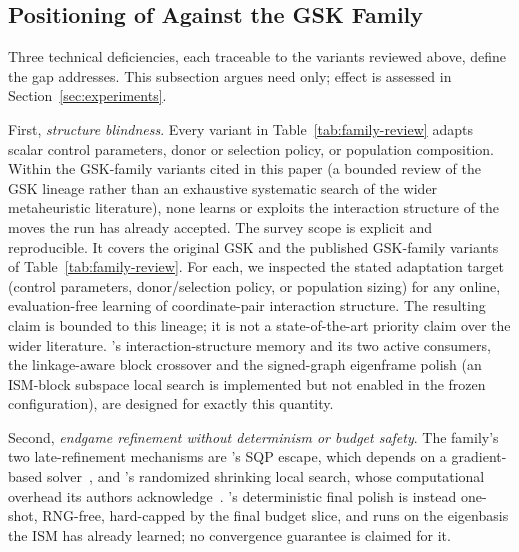 \subsection{Positioning of \dtgsk{} Against the GSK Family}\label{sec:rel:positioning}

Three technical deficiencies, each traceable to the variants reviewed
above, define the gap \dtgsk{} addresses. This subsection argues need
only; effect is assessed in Section~\ref{sec:experiments}.

First, \emph{structure blindness}. Every variant in
Table~\ref{tab:family-review} adapts scalar control parameters, donor or
selection policy, or population composition. Within the GSK-family variants
cited in this paper (a bounded review of the GSK lineage rather than an
exhaustive systematic search of the wider metaheuristic literature), none
learns or exploits the interaction
structure of the moves the run has already accepted. The survey scope is explicit and reproducible. It covers the original GSK
and the published GSK-family variants of Table~\ref{tab:family-review}. For
each, we inspected the stated adaptation target (control parameters,
donor/selection policy, or population sizing) for any online,
evaluation-free learning of coordinate-pair interaction structure. The
resulting claim is bounded to this lineage; it is not a state-of-the-art
priority claim over the wider literature. %
\dtgsk{}'s interaction-structure memory and its two active consumers,
the linkage-aware block crossover and the signed-graph eigenframe polish
(an ISM-block subspace local search is implemented but not enabled
in the frozen configuration), are designed for exactly this quantity.

Second, \emph{endgame refinement without determinism or budget safety}.
The family's two late-refinement mechanisms are \egsk{}'s SQP escape,
which depends on a gradient-based solver~\cite{jawad2024egsk}, and
\atmals{}'s randomized shrinking local search, whose computational
overhead its authors acknowledge~\cite{alfadli2025atmals}. \dtgsk{}'s
deterministic final polish is instead one-shot, RNG-free, hard-capped by
the final budget slice, and runs on the eigenbasis the ISM has already
learned; no convergence guarantee is claimed for it.

